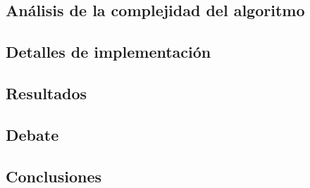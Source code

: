 \paragraph{}




\subsection{Análisis de la complejidad del algoritmo}
\subsection{Detalles de implementación}
\subsection{Resultados}
\subsection{Debate}
\subsection{Conclusiones}
